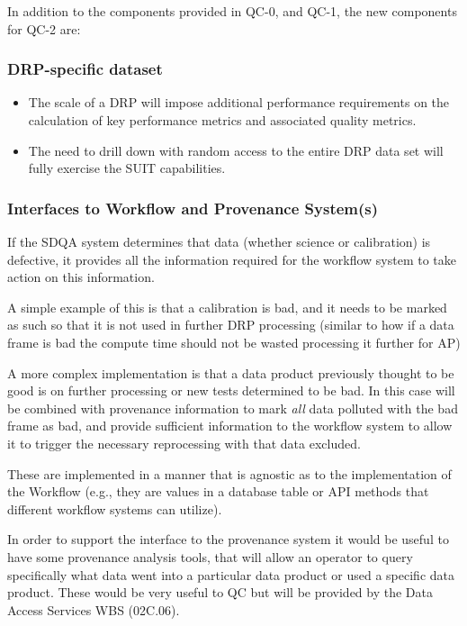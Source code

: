 \documentclass[DM,toc,lsstdraft]{lsstdoc}
\begin{document}
In addition to the components provided in QC-0, and QC-1, the new components for QC-2 are:

\subsubsection{DRP-specific dataset}
\label{sec:qaDrpDataset}
\begin{itemize}
\item The scale of a DRP will impose additional performance requirements on the calculation of key performance metrics and associated quality metrics.
\item The need to drill down with random access to the entire DRP data set will fully exercise the SUIT capabilities.
\end{itemize}


\subsubsection{Interfaces to Workflow and Provenance System(s)}
\label{sec:qaOutputInterfaceWorkflowSystem}

If the SDQA system determines that data (whether science or calibration) is defective, it provides all the information required for the workflow system to take action on this information.

A simple example of this is that a calibration is bad, and it needs to be marked as such so that it is not used in further DRP processing (similar to how if a data frame is bad the compute time should not be wasted processing it further for AP)

A more complex implementation is that a data product previously thought to be good is on further processing or new tests determined to be bad. In this case will be combined with provenance information to mark \emph{all} data polluted with the bad frame as bad, and provide sufficient information to the workflow system to allow it to trigger the necessary reprocessing with that data excluded.

These are implemented in a manner that is agnostic as to the implementation of the Workflow (e.g., they are values in a database table or API methods that different workflow systems can utilize).

In order to support the interface to the provenance system it would be useful to have some provenance analysis tools, that will allow an operator to query specifically what data went into a particular data product or used a specific data product. These would be very useful to QC but will be provided by the Data Access Services WBS (02C.06).
\end{document}
